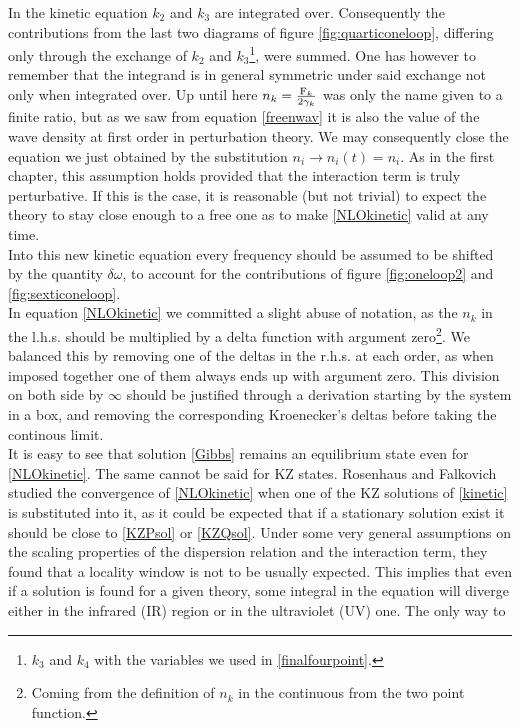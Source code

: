 In the kinetic equation $k_2$ and $k_3$ are integrated over. Consequently the contributions from the last two diagrams of figure \ref{fig:quarticoneloop}, 
differing only through the exchange of $k_2$ and $k_3$\footnote{
    $k_3$ and $k_4$ with the variables we used in \eqref{finalfourpoint}.
}, were summed. One has however to remember that the integrand is in general symmetric under said exchange not only when integrated over.  
Up until here $n_k = \frac{\mathrm{F}_k}{2\gamma_k}$ was only the name given to a finite ratio, but as we saw from equation \eqref{freenwav} it is also the value of the 
wave density at first order in perturbation theory. We may consequently close the equation we just obtained by the substitution $n_i \rightarrow n_i(t) = n_i$. 
As in the first chapter, this assumption holds provided that the interaction term is truly perturbative. If this is the case, it is reasonable (but not trivial) 
to expect the theory to stay close enough to a free one as to make \eqref{NLOkinetic} valid at any time. \\ 
Into this new kinetic equation every frequency should be assumed to be shifted by the quantity $\delta\omega$, to account for the contributions of 
figure \ref{fig:oneloop2} and \ref{fig:sexticoneloop}.\\
In equation \eqref{NLOkinetic} we committed a slight abuse of notation, as the $n_k$ in the l.h.s. should be multiplied by a delta function with argument zero\footnote{Coming from the definition of $n_k$ in the continuous from the two point function.}. We balanced this by removing one of the deltas in the r.h.s. at each order, as when imposed together one of them always ends up with argument zero. This division on both side by $\infty$ should be justified through a derivation starting by the system in a box, and removing the corresponding Kroenecker's deltas before taking the continous limit.\\
It is easy to see that solution \eqref{Gibbs} remains an equilibrium state even for \eqref{NLOkinetic}. The same cannot be said for 
KZ states. Rosenhaus and Falkovich studied the convergence of \eqref{NLOkinetic} when one of the KZ solutions of \eqref{kinetic} is substituted into it, 
as it could be expected that if a stationary solution exist it should be close to \eqref{KZPsol} or \eqref{KZQsol}. Under some very general assumptions on the 
scaling properties of the dispersion relation and the interaction term, they found that a locality window is not to be usually expected. This implies that even if 
a solution is found for a given theory, some integral in the equation will diverge either in the infrared (IR) region or in the ultraviolet (UV) one. The only way to
